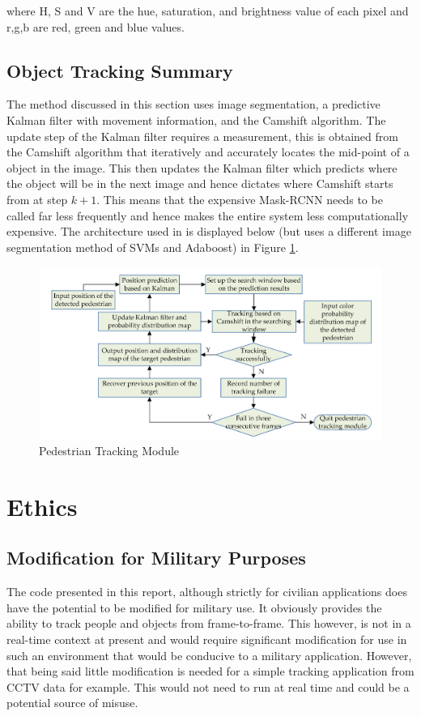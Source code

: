 \documentclass[a4paper,11pt,notitlepage]{article}
\begin{document}
where H, S and V are the hue, saturation, and brightness value of each pixel and r,g,b are red, green and blue values.

\subsection{Object Tracking Summary}

The method discussed in this section uses image segmentation, a predictive Kalman filter with movement information, and the Camshift algorithm. The update step of the Kalman filter requires a measurement, this is obtained from the Camshift algorithm that iteratively and accurately locates the mid-point of a object in the image. This then updates the Kalman filter which predicts where the object will be in the next image and hence dictates where Camshift starts from at step $k+1$. This means that the expensive Mask-RCNN needs to be called far less frequently and hence makes the entire system less computationally expensive. The architecture used in \cite{Ped_tract} is displayed below (but uses a different image segmentation method of SVMs and Adaboost) in Figure \ref{Ped_tr_mod_fig}.

\noindent \begin{figure}[h!]
\includegraphics[width = 1.0\hsize]{figures/pedestrian_tracking_module.png}
\caption{Pedestrian Tracking Module \cite{Ped_tract} }
\label{Ped_tr_mod_fig}
\end{figure}

\newpage

\section{Ethics}

\subsection{Modification for Military Purposes}
The code presented in this report, although strictly for civilian applications does have the potential to be modified for military use. It obviously provides the ability to track people and objects from frame-to-frame. This however, is not in a real-time context at present and would require significant modification for use in such an environment that would be conducive to a military application. However, that being said little modification is needed for a simple tracking application from CCTV data for example. This would not need to run at real time and could be a potential source of misuse.
\end{document}
